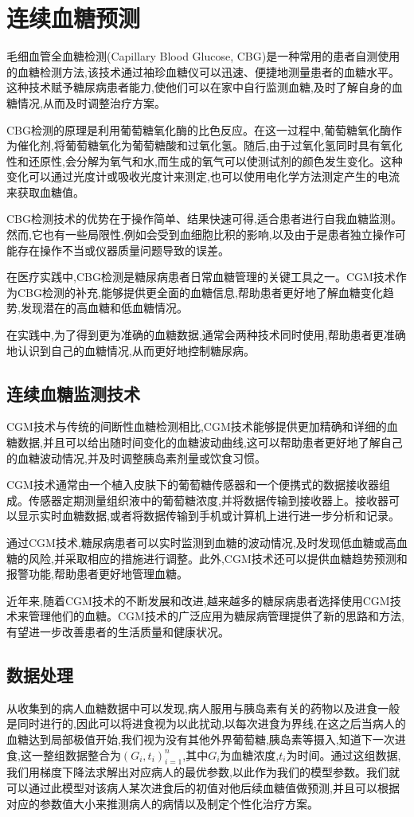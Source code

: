 \chapter{连续血糖预测}\label{chap:predict}

毛细血管全血糖检测(Capillary Blood Glucose, CBG)是一种常用的患者自测使用的血糖检测方法,该技术通过袖珍血糖仪可以迅速、便捷地测量患者的血糖水平。这种技术赋予糖尿病患者能力,使他们可以在家中自行监测血糖,及时了解自身的血糖情况,从而及时调整治疗方案。

CBG检测的原理是利用葡萄糖氧化酶的比色反应。在这一过程中,葡萄糖氧化酶作为催化剂,将葡萄糖氧化为葡萄糖酸和过氧化氢。随后,由于过氧化氢同时具有氧化性和还原性,会分解为氧气和水,而生成的氧气可以使测试剂的颜色发生变化。这种变化可以通过光度计或吸收光度计来测定,也可以使用电化学方法测定产生的电流来获取血糖值。

CBG检测技术的优势在于操作简单、结果快速可得,适合患者进行自我血糖监测。然而,它也有一些局限性,例如会受到血细胞比积的影响,以及由于是患者独立操作可能存在操作不当或仪器质量问题导致的误差。

在医疗实践中,CBG检测是糖尿病患者日常血糖管理的关键工具之一。CGM技术作为CBG检测的补充,能够提供更全面的血糖信息,帮助患者更好地了解血糖变化趋势,发现潜在的高血糖和低血糖情况。

在实践中,为了得到更为准确的血糖数据,通常会两种技术同时使用,帮助患者更准确地认识到自己的血糖情况,从而更好地控制糖尿病。

\section{连续血糖监测技术}
CGM技术与传统的间断性血糖检测相比,CGM技术能够提供更加精确和详细的血糖数据,并且可以给出随时间变化的血糖波动曲线,这可以帮助患者更好地了解自己的血糖波动情况,并及时调整胰岛素剂量或饮食习惯。

CGM技术通常由一个植入皮肤下的葡萄糖传感器和一个便携式的数据接收器组成。传感器定期测量组织液中的葡萄糖浓度,并将数据传输到接收器上。接收器可以显示实时血糖数据,或者将数据传输到手机或计算机上进行进一步分析和记录。

通过CGM技术,糖尿病患者可以实时监测到血糖的波动情况,及时发现低血糖或高血糖的风险,并采取相应的措施进行调整。此外,CGM技术还可以提供血糖趋势预测和报警功能,帮助患者更好地管理血糖\cite{vigersky2017role}。

近年来,随着CGM技术的不断发展和改进,越来越多的糖尿病患者选择使用CGM技术来管理他们的血糖。CGM技术的广泛应用为糖尿病管理提供了新的思路和方法,有望进一步改善患者的生活质量和健康状况。
\section{数据处理}
从收集到的病人血糖数据\cite{zhao2023chinese}中可以发现,病人服用与胰岛素有关的药物以及进食一般是同时进行的,因此可以将进食视为以此扰动,以每次进食为界线,在这之后当病人的血糖达到局部极值开始,我们视为没有其他外界葡萄糖,胰岛素等摄入,知道下一次进食,这一整组数据整合为$(G_i,t_i)_{i=1}^n$,其中$G_i$为血糖浓度,$t_i$为时间。通过这组数据,我们用梯度下降法求解出对应病人的最优参数,以此作为我们的模型参数。我们就可以通过此模型对该病人某次进食后的初值对他后续血糖值做预测,并且可以根据对应的参数值大小来推测病人的病情以及制定个性化治疗方案。

